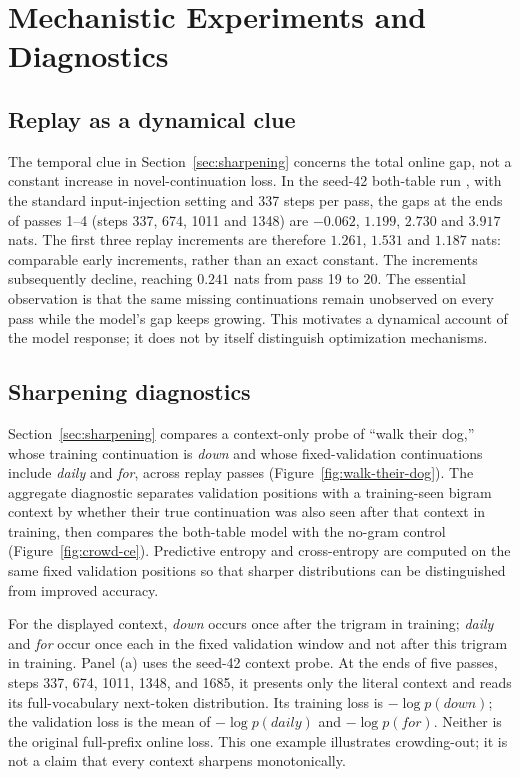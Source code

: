 \section{Mechanistic Experiments and Diagnostics}
\label{app:mechanistic}

\subsection{Replay as a dynamical clue}
\label{app:replay-clue}

The temporal clue in Section~\ref{sec:sharpening} concerns the total online gap, not a constant increase in novel-continuation loss. In the seed-42 both-table run , with the standard input-injection setting and 337 steps per pass, the gaps at the ends of passes 1--4 (steps 337, 674, 1011 and 1348) are $-0.062$, $1.199$, $2.730$ and $3.917$ nats. The first three replay increments are therefore $1.261$, $1.531$ and $1.187$ nats: comparable early increments, rather than an exact constant. The increments subsequently decline, reaching $0.241$ nats from pass 19 to 20. The essential observation is that the same missing continuations remain unobserved on every pass while the model's gap keeps growing. This motivates a dynamical account of the model response; it does not by itself distinguish optimization mechanisms.

\subsection{Sharpening diagnostics}

Section~\ref{sec:sharpening} compares a context-only probe of ``walk their dog,'' whose training continuation is \emph{down} and whose fixed-validation continuations include \emph{daily} and \emph{for}, across replay passes (Figure~\ref{fig:walk-their-dog}). The aggregate diagnostic separates validation positions with a training-seen bigram context by whether their true continuation was also seen after that context in training, then compares the both-table model with the no-gram control (Figure~\ref{fig:crowd-ce}). Predictive entropy and cross-entropy are computed on the same fixed validation positions so that sharper distributions can be distinguished from improved accuracy.

For the displayed context, \emph{down} occurs once after the trigram in training; \emph{daily} and \emph{for} occur once each in the fixed validation window and not after this trigram in training. Panel (a) uses the seed-42  context probe. At the ends of five passes, steps 337, 674, 1011, 1348, and 1685, it presents only the literal context and reads its full-vocabulary next-token distribution. Its training loss is $-\log p(\textit{down})$; the validation loss is the mean of $-\log p(\textit{daily})$ and $-\log p(\textit{for})$. Neither is the original full-prefix online loss. This one example illustrates crowding-out; it is not a claim that every context sharpens monotonically.

